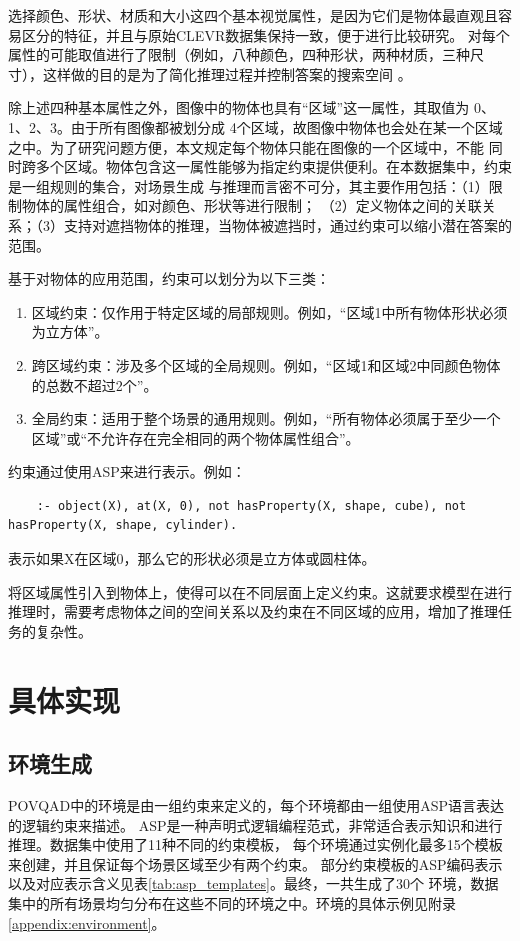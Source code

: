 选择颜色、形状、材质和大小这四个基本视觉属性，是因为它们是物体最直观且容易区分的特征，并且与原始CLEVR数据集保持一致，便于进行比较研究。
对每个属性的可能取值进行了限制（例如，八种颜色，四种形状，两种材质，三种尺寸），这样做的目的是为了简化推理过程并控制答案的搜索空间 。

除上述四种基本属性之外，图像中的物体也具有“区域”这一属性，其取值为 0、1、2、3。由于所有图像都被划分成
4个区域，故图像中物体也会处在某一个区域之中。为了研究问题方便，本文规定每个物体只能在图像的一个区域中，不能
同时跨多个区域。物体包含这一属性能够为指定约束提供便利。在本数据集中，约束是一组规则的集合，对场景生成
与推理而言密不可分，其主要作用包括：（1）限制物体的属性组合，如对颜色、形状等进行限制；
（2）定义物体之间的关联关系；（3）支持对遮挡物体的推理，当物体被遮挡时，通过约束可以缩小潜在答案的范围。

基于对物体的应用范围，约束可以划分为以下三类：
\begin{enumerate}[itemsep=0pt,parsep=0pt]
    \item 区域约束：仅作用于特定区域的局部规则。例如，“区域1中所有物体形状必须为立方体”。
    \item 跨区域约束：涉及多个区域的全局规则。例如，“区域1和区域2中同颜色物体的总数不超过2个”。
    \item 全局约束：适用于整个场景的通用规则。例如，“所有物体必须属于至少一个区域”或“不允许存在完全相同的两个物体属性组合”。
\end{enumerate}

约束通过使用ASP来进行表示。例如：
\begin{lstlisting}
    :- object(X), at(X, 0), not hasProperty(X, shape, cube), not hasProperty(X, shape, cylinder).
\end{lstlisting}
表示如果X在区域0，那么它的形状必须是立方体或圆柱体。

将区域属性引入到物体上，使得可以在不同层面上定义约束。这就要求模型在进行推理时，需要考虑物体之间的空间关系以及约束在不同区域的应用，增加了推理任务的复杂性。
\section{具体实现}

\subsection{环境生成}
POVQAD中的环境是由一组约束来定义的，每个环境都由一组使用ASP语言表达的逻辑约束来描述。
ASP是一种声明式逻辑编程范式，非常适合表示知识和进行推理。数据集中使用了11种不同的约束模板，
每个环境通过实例化最多15个模板来创建，并且保证每个场景区域至少有两个约束。
部分约束模板的ASP编码表示以及对应表示含义见表\ref{tab:asp_templates}。最终，一共生成了30个
环境，数据集中的所有场景均匀分布在这些不同的环境之中。环境的具体示例见附录\ref{appendix:environment}。

